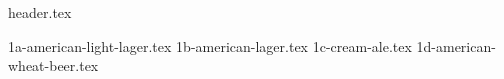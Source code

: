 \clearpage
{}
\divisorLine
{header.tex}
\begin{multicols*}{2}
{1a-american-light-lager.tex}
{1b-american-lager.tex}
{1c-cream-ale.tex}
{1d-american-wheat-beer.tex}
\end{multicols*}